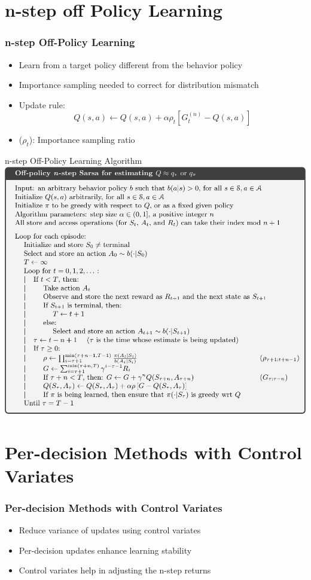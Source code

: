 \documentclass{beamer}
\begin{document}
    \section{n-step off Policy Learning}
    \begin{frame}
        \frametitle{n-step Off-Policy Learning}
        \begin{itemize}
            \item Learn from a target policy different from the behavior policy
            \item Importance sampling needed to correct for distribution mismatch
            \item Update rule:
            $$
            Q(s,a) \leftarrow Q(s,a) + \alpha \rho_t \left[G_t^{(n)} - Q(s,a)\right]
            $$
            \item ($\rho_t$): Importance sampling ratio
        \end{itemize}
    \end{frame}

    \begin{frame}{n-step Off-Policy Learning Algorithm}
        \includegraphics[width=\textwidth]{n-step-offp.png}
    \end{frame}

    \section{Per-decision Methods with Control Variates}
    \begin{frame}
        \frametitle{Per-decision Methods with Control Variates}
        \begin{itemize}
            \item Reduce variance of updates using control variates
            \item Per-decision updates enhance learning stability
            \item Control variates help in adjusting the n-step returns
        \end{itemize}
    \end{frame}
\end{document}
